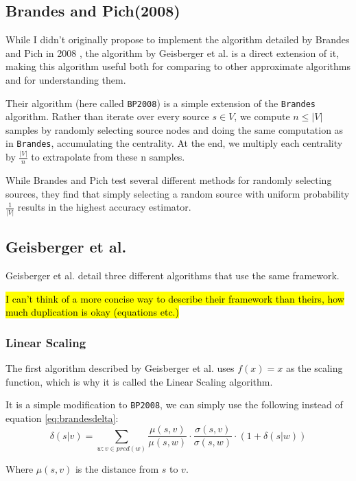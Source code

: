 \documentclass[a4paper,12pt]{article}
\begin{document}
\subsection*{Brandes and Pich(2008)}
While I didn't originally propose to implement the algorithm detailed by Brandes and Pich in 2008 \cite{brandes2008}, the algorithm by Geisberger et al. is a direct extension of it, making this algorithm useful both for comparing to other approximate algorithms and for understanding them.

Their algorithm (here called \texttt{BP2008}) is a simple extension of the \texttt{Brandes} algorithm. Rather than iterate over every source $s \in V$, we compute $n \leq |V|$ samples by randomly selecting source nodes and doing the same computation as in \texttt{Brandes}, accumulating the centrality. At the end, we multiply each centrality by $\frac{|V|}{n}$ to extrapolate from these n samples.

While Brandes and Pich test several different methods for randomly selecting sources, they find that simply selecting a random source with uniform probability $\frac{1}{|V|}$ results in the highest accuracy estimator.
 
\subsection{Geisberger et al.}
Geisberger et al. detail three different algorithms that use the same framework. 

\hl{I can't think of a more concise way to describe their framework than theirs, how much duplication is okay (equations etc.)}

\subsubsection{Linear Scaling}
The first algorithm described by Geisberger et al. uses $f(x) = x$ as the scaling function, which is why it is called the Linear Scaling algorithm.

It is a simple modification to \texttt{BP2008}, we can simply use the following instead of equation \ref{eq:brandesdelta}:
\begin{equation} \label{eq:lineardelta}
\delta(s|v) = \sum_{w: v \in pred(w)} \frac{\mu(s,v)}{\mu(s,w)} \cdot \frac{\sigma(s,v)}{\sigma(s,w)} \cdot (1+\delta(s|w))
\end{equation}

Where $\mu(s,v)$ is the distance from $s$ to $v$.
\end{document}

